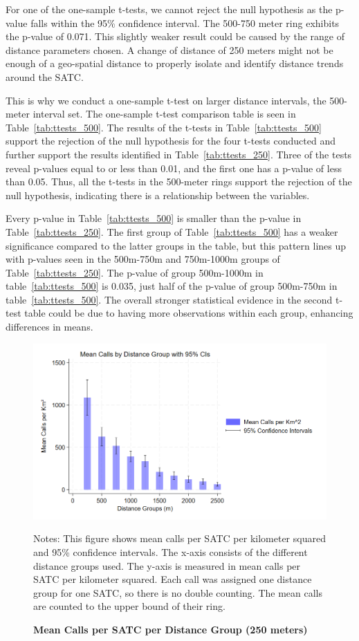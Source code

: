 \documentclass[12pt]{article}
\begin{document}
For one of the one-sample t-tests, we cannot reject the null hypothesis as the p-value falls within the 95\% confidence interval. The 500-750 meter ring exhibits the p-value of 0.071. This slightly weaker result could be caused by the range of distance parameters chosen. A change of distance of 250 meters might not be enough of a geo-spatial distance to properly isolate and identify distance trends around the SATC. 

This is why we conduct a one-sample t-test on larger distance intervals, the 500-meter interval set. The one-sample t-test comparison table is seen in Table~\ref{tab:ttests_500}. The results of the t-tests in Table~\ref{tab:ttests_500} support the rejection of the null hypothesis for the four t-tests conducted and further support the results identified in Table~\ref{tab:ttests_250}. Three of the tests reveal p-values equal to or less than 0.01, and the first one has a p-value of less than 0.05. Thus, all the t-tests in the 500-meter rings support the rejection of the null hypothesis, indicating there is a relationship between the variables. 

Every p-value in Table~\ref{tab:ttests_500} is smaller than the p-value in Table~\ref{tab:ttests_250}. The first group of Table~\ref{tab:ttests_500} has a weaker significance compared to the latter groups in the table, but this pattern lines up with p-values seen in the 500m-750m and 750m-1000m groups of Table~\ref{tab:ttests_250}. The p-value of group 500m-1000m in table~\ref{tab:ttests_500} is 0.035, just half of the p-value of group 500m-750m in table~\ref{tab:ttests_500}. The overall stronger statistical evidence in the second t-test table could be due to having more observations within each group, enhancing differences in means.

\begin{figure}[H]
    \centering
\includegraphics[width=0.75\linewidth]{Reproducibility Package/Downloaded_calls/Visual_Graphics_Downloaded_calls/250_CI_Graph.png}
    \caption{\textbf{Mean Calls per SATC per Distance Group (250 meters)}}
     \label{fig:Figure3}
    \centering\footnotesize{Notes: This figure shows mean calls per SATC per kilometer squared and 95\% confidence intervals. The x-axis consists of the different distance groups used. The y-axis is measured in mean calls per SATC per kilometer squared. Each call was assigned one distance group for one SATC, so there is no double counting. The mean calls are counted to the upper bound of their ring.}
\end{figure}
\end{document}
